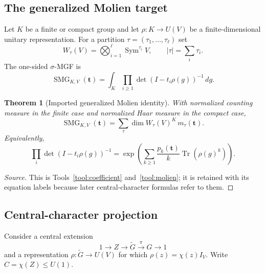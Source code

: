 \documentclass[10pt]{article}
\newcommand{\Sym}{\operatorname{Sym}}
\newcommand{\Tr}{\operatorname{Tr}}
\newcommand{\SMG}{\operatorname{SMG}}
\newcommand{\MGF}{\SMG}
\newtheorem{theorem}{Theorem}
\begin{document}
\subsection{The generalized Molien target}

Let $K$ be a finite or compact group and let
$\rho:K\to U(V)$ be a finite-dimensional unitary representation.  For a
partition $\tau=(\tau_1,\ldots,\tau_\ell)$ set
\[
 W_\tau(V)=\bigotimes_{i=1}^{\ell}\Sym^{\tau_i}V,
 \qquad |\tau|=\sum_i\tau_i.
\]
The one-sided $\sigma$-MGF is
\begin{equation}\label{nd:central_extensions:eq:molien}
 \MGF_{K,V}(\mathbf t)
 =\int_K\prod_{i\geq1}\det(I-t_i\rho(g))^{-1}\,dg.
\end{equation}

\begin{theorem}[Imported generalized Molien identity]\label{nd:central_extensions:thm:molien}
With normalized counting measure in the finite case and normalized Haar
measure in the compact case,
\[
 \MGF_{K,V}(\mathbf t)
 =\sum_\tau\dim W_\tau(V)^K\,m_\tau(\mathbf t).
\]
Equivalently,
\begin{equation}\label{nd:central_extensions:eq:trace-exp}
 \prod_i\det(I-t_i\rho(g))^{-1}
 =\exp\!\left(\sum_{k\geq1}\frac{p_k(\mathbf t)}{k}
                   \Tr(\rho(g)^k)\right).
\end{equation}
\end{theorem}

\begin{proof}[Source]
This is Tools~\ref{tool:coefficient} and~\ref{tool:molien}; it is retained
with its equation labels because later central-character formulas refer to
them.
\end{proof}

\subsection{Central-character projection}

Consider a central extension
\begin{equation}\label{nd:central_extensions:eq:extension}
 1\longrightarrow Z\longrightarrow\widetilde G
 \xrightarrow{\pi}G\longrightarrow1
\end{equation}
and a representation $\rho:\widetilde G\to U(V)$ for which
$\rho(z)=\chi(z)I_V$.  Write $C=\chi(Z)\leq U(1)$.
\end{document}
